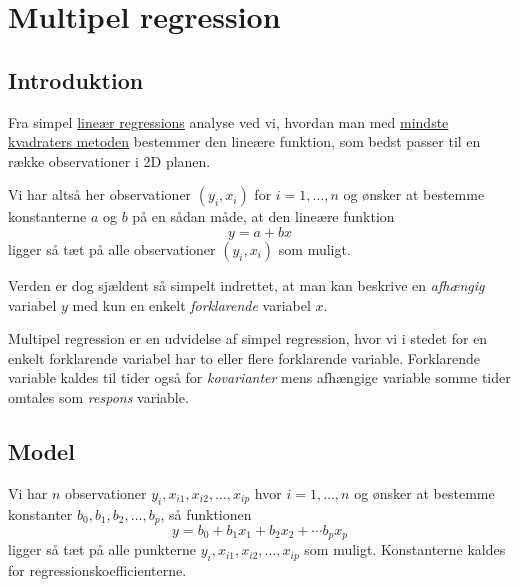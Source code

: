 
\section{Multipel regression}

\subsection{Introduktion}
Fra simpel \href{http://www.webmatematik.dk/lektioner/matematik-b/regression}{lineær regressions} analyse ved vi, hvordan man med \href{http://www.webmatematik.dk/lektioner/matematik-b/regression}{mindste kvadraters metoden} bestemmer den lineære funktion, som bedst passer til en række observationer i 2D planen.

Vi har altså her observationer \((y_i, x_i)\) for \(i=1,\ldots,n\) og ønsker at bestemme konstanterne \(a\) og \(b\) på en sådan måde, at den lineære funktion
\begin{displaymath}
  y = a + b x
\end{displaymath}
ligger så tæt på alle observationer \((y_i, x_i)\) som muligt.

Verden er dog sjældent så simpelt indrettet, at man kan beskrive en \textit{afhængig} variabel \(y\) med kun en enkelt \textit{forklarende} variabel \(x\).

Multipel regression er en udvidelse af simpel regression, hvor vi i stedet for en enkelt for\-kla\-ren\-de variabel har to eller flere forklarende variable. For\-kla\-ren\-de variable kaldes til tider også for \textit{kovarianter} mens afhængige variable somme tider omtales som \textit{respons} variable.

\subsection{Model}
Vi har \(n\) observationer \(y_i,x_{i1},x_{i2},\ldots,x_{ip}\) hvor \(i=1,\ldots,n\) og ønsker at bestemme konstanter \(b_0,b_1,b_2,\ldots,b_p\), så funktionen
\begin{displaymath}
  y = b_0 + b_1 x_1 + b_2 x_2 + \cdots b_p x_p
\end{displaymath}
ligger så tæt på alle punkterne \(y_i,x_{i1},x_{i2},\ldots,x_{ip}\) som muligt. Konstanterne kaldes for regressionskoefficienterne.

